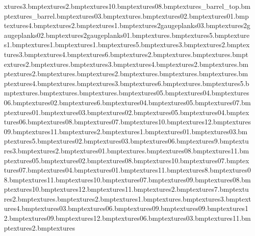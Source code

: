 xtures\toolbox3.bmp textures\workhutwall2.bmp textures\wwrock10.bmp textures\wwrock08.bmp textures\exp_barrel_top.bmp textures\exp_barrel.bmp textures\dynamite03.bmp textures\fuse.bmp textures\dynamite02.bmp textures\dynamite01.bmp textures\wbridge4.bmp textures\wbridge2.bmp textures\wbridge1.bmp textures\12gaugeplanks03.bmp textures\12gaugeplanks02.bmp textures\12gaugeplanks01.bmp textures\plankswoodends.bmp textures\specminerock5.bmp textures\specminerock1.bmp textures\specminerockex1.bmp textures\specminerockexp1.bmp textures\specmineroline5.bmp textures\specminerock3.bmp textures\specminerock2.bmp textures\specmineroline3.bmp textures\specminerock4.bmp textures\specminerock6.bmp textures\minesafe2.bmp textures\minewatertowersign.bmp textures\minewatertower.bmp textures\minewatertower2.bmp textures\minefloorpathend.bmp textures\stalatites3.bmp textures\minemodedge4.bmp textures\crystalgreen2.bmp textures\crystalgreen.bmp textures\crystalred2.bmp textures\crystalred.bmp textures\crystalblu2.bmp textures\crystalblue.bmp textures\blackbits.bmp textures\crystalwhite.bmp textures\minefloorpath4.bmp textures\minefloorpath.bmp textures\minefloor3.bmp textures\minemodedge6.bmp textures\minefloor.bmp textures\minemodedge5.bmp textures\turntable.bmp textures\minefloorcorner.bmp textures\supportbase.bmp textures\minerockgold05.bmp textures\minerockgold04.bmp textures\minerockgold06.bmp textures\minerockgold02.bmp textures\minefloor6.bmp textures\sandrock04.bmp textures\sandrock05.bmp textures\sandrock07.bmp textures\minerockgolder01.bmp textures\minerockgolder03.bmp textures\minerockgolder02.bmp textures\minerockgolder05.bmp textures\minerockgolder04.bmp textures\minerockgolder06.bmp textures\minerockgolder08.bmp textures\minerockgolder07.bmp textures\minerockgolder10.bmp textures\minerockgolder12.bmp textures\minerockgolder09.bmp textures\minerockgolder11.bmp textures\minerockyellbase2.bmp textures\minerockyellbase1.bmp textures\minerockgold01.bmp textures\minerockgold03.bmp textures\minefloor5.bmp textures\sandrock02.bmp textures\sandrock03.bmp textures\sandrock06.bmp textures\minefloor9.bmp textures\minerockyellbase3.bmp textures\stalatites2.bmp textures\sandrock01.bmp textures\stalatites.bmp textures\minerocktools08.bmp textures\minerocktools11.bmp textures\minerocknorm05.bmp textures\minerocknorm02.bmp textures\minerockextra08.bmp textures\minerocknorm10.bmp textures\minerocknorm07.bmp textures\minerockextra07.bmp textures\minerocknorm04.bmp textures\minerocknorm01.bmp textures\minefloor11.bmp textures\minefloor8.bmp textures\minetunn08.bmp textures\minetunn11.bmp textures\minefloor10.bmp textures\minerockgold07.bmp textures\minerockgold09.bmp textures\minerockgold08.bmp textures\minerockgold10.bmp textures\minerockgold12.bmp textures\minerockgold11.bmp textures\minejoiner2.bmp textures\minefloor7.bmp textures\minefloor2.bmp textures\minejoiner.bmp textures\minelights2.bmp textures\minelights1.bmp textures\minefloorwarn.bmp textures\minelights3.bmp textures\minefloor4.bmp textures\minerocknorm03.bmp textures\minerocknorm06.bmp textures\minerockextra09.bmp textures\minerocknorm09.bmp textures\minerocknorm12.bmp textures\minerock09.bmp textures\minerock12.bmp textures\minerock06.bmp textures\minerock03.bmp textures\minerock11.bmp textures\minefloorpath2.bmp textures